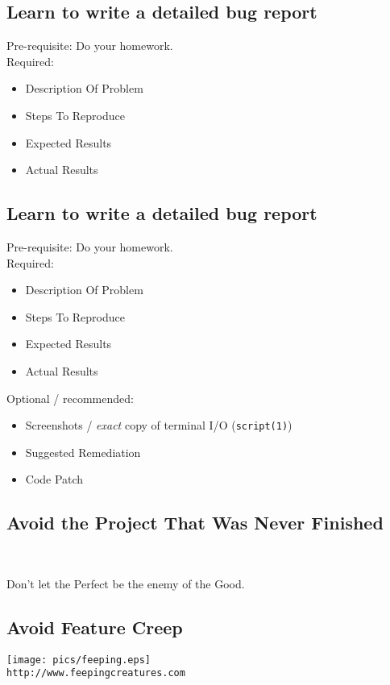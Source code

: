 \documentclass[xga]{xdvislides}
\begin{document}
\subsection{Learn to write a detailed bug report}
Pre-requisite: Do your homework. \\

Required:
\begin{itemize}
	\item Description Of Problem
	\item Steps To Reproduce
	\item Expected Results
	\item Actual Results
\end{itemize}

\subsection{Learn to write a detailed bug report}
Pre-requisite: Do your homework. \\

Required:
\begin{itemize}
	\item Description Of Problem
	\item Steps To Reproduce
	\item Expected Results
	\item Actual Results
\end{itemize}
\vspace{.125in}

Optional / recommended:
\begin{itemize}
	\item Screenshots / {\em exact} copy of terminal I/O ({\tt script(1)})
	\item Suggested Remediation
	\item Code Patch
\end{itemize}

\subsection{Avoid the Project That Was Never Finished}
\\
\Huge
\begin{center}
	Don't let the Perfect be the enemy of the Good.
\end{center}
\Normalsize

\subsection{Avoid Feature Creep}
\vspace*{\fill}
\begin{center}
	\texttt{[image: pics/feeping.eps]} \\
	\small
	\verb+http://www.feepingcreatures.com+
\end{center}
\vspace*{\fill}
\end{document}
